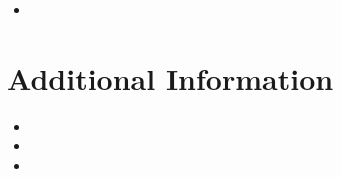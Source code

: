 \documentclass[a4paper,10pt]{article}
\begin{document}
\begin{itemize}

\item
\hspace{20pt}
 

\end{itemize}

\section*{Additional Information}

\begin{itemize}

\item

\item

\item

\end{itemize}
\end{document}
